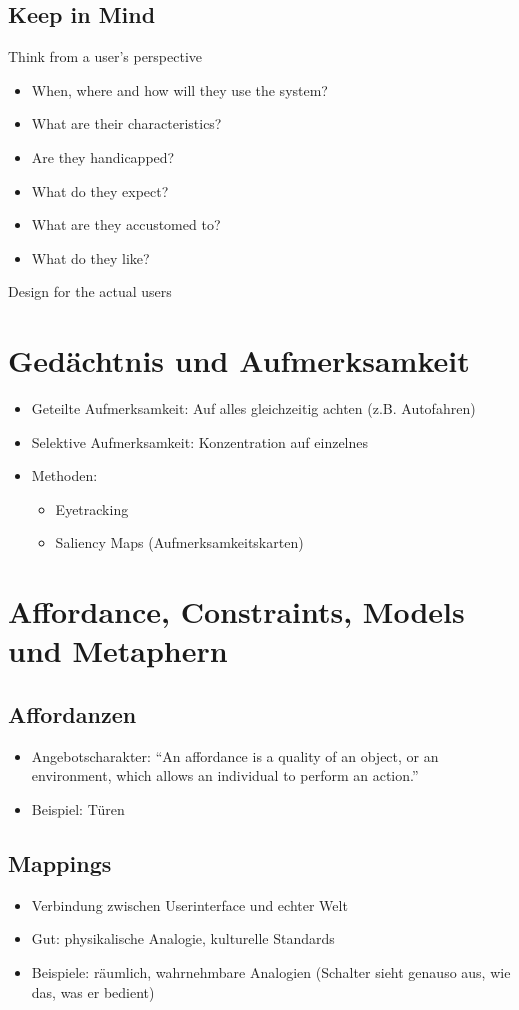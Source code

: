 \documentclass[a4paper,10pt]{article}
\begin{document}
\subsection{Keep in Mind}
Think from a user's perspective
\begin{itemize}
	\item When, where and how will they use the system?
	\item What are their characteristics?
	\item Are they handicapped?
	\item What do they expect?
	\item What are they accustomed to?
	\item What do they like?
\end{itemize}
Design for the actual users

\section{Gedächtnis und Aufmerksamkeit}
\begin{itemize}
	\item Geteilte Aufmerksamkeit: Auf alles gleichzeitig achten (z.B. Autofahren)
	\item Selektive Aufmerksamkeit: Konzentration auf einzelnes
	\item Methoden:
	\begin{itemize}
		\item Eyetracking
		\item Saliency Maps (Aufmerksamkeitskarten)
	\end{itemize}
\end{itemize}

\section{Affordance, Constraints, Models und Metaphern}

\subsection{Affordanzen}
\begin{itemize}
	\item Angebotscharakter: “An affordance is a quality of an object, or an environment, which allows an individual to perform an action.”
	\item Beispiel: Türen
\end{itemize}

\subsection{Mappings}
\begin{itemize}
	\item Verbindung zwischen Userinterface und echter Welt
	\item Gut: physikalische Analogie, kulturelle Standards
	\item Beispiele: räumlich, wahrnehmbare Analogien (Schalter sieht genauso aus, wie das, was er bedient)
\end{itemize}
\end{document}
